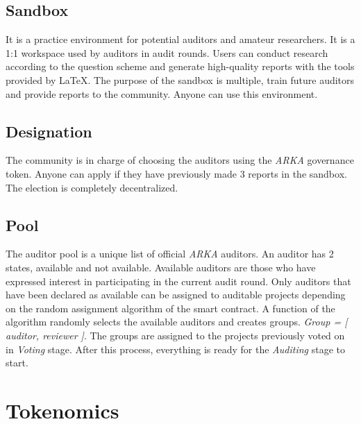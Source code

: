 \documentclass[12pt]{article}
\begin{document}
\subsection { Sandbox }

It is a practice environment for potential auditors and amateur researchers. It is a 1:1 workspace used by auditors in audit rounds. Users can conduct research according to the question scheme and generate high-quality reports with the tools provided by LaTeX. The purpose of the sandbox is multiple, train future auditors and provide reports to the community. Anyone can use this environment.


\subsection { Designation }

The community is in charge of choosing the auditors using the \emph{ARKA} governance token. Anyone can apply if they have previously made 3 reports in the sandbox. The election is completely decentralized.
 

\subsection { Pool }

The auditor pool is a unique list of official \emph{ARKA} auditors. An auditor has 2 states, available and not available. Available auditors are those who have expressed interest in participating in the current audit round. Only auditors that have been declared as available can be assigned to auditable projects depending on the random assignment algorithm of the smart contract. A function of the algorithm randomly selects the available auditors and creates groups. \emph{Group = [ auditor, reviewer ]}. The groups are assigned to the projects previously voted on in \emph{Voting} stage. After this process, everything is ready for the \emph{Auditing} stage to start. 


\section { Tokenomics }
\end{document}
